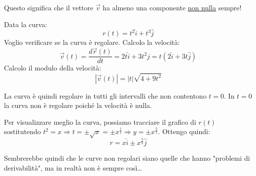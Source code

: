 Questo significa che il vettore $\vec v$ ha almeno una componente \underline{non nulla} sempre!

\begin{example}
    Data la curva:
    \begin{equation*}
        r(t)= t^2 \hat i + t^3 \hat j
    \end{equation*}
    Voglio verificare se la curva è regolare. Calcolo la velocità:
    \begin{equation*}
        \vec v(t) = \frac{d \vec r(t)}{dt} = 2t \hat i + 3t^2 \hat j=t(2\hat i + 3t \hat j)
    \end{equation*}
    Calcolo il modulo della velocità:
    \begin{equation*}
        |\vec v(t)| = |t| \sqrt{4 + 9t^2}
    \end{equation*}

    La curva è quindi regolare in tutti gli intervalli che non contentono $t=0$. In $t=0$ la curva non è regolare poiché la velocità è nulla.

    Per visualizzare meglio la curva, possiamo tracciare il grafico di $r(t)$ sostitutendo $t^2=x \Rightarrow t=\pm\sqrt{x}=\pm x^{\frac{1}{2}} \Rightarrow y=\pm x^{\frac{3}{2}}$. Ottengo quindi:
    \begin{equation*}
        r=x \hat i \pm x^{\frac{3}{2}} \hat j
    \end{equation*}

    \begin{figure}[H]
        \centering
    \end{figure}

\end{example}

Sembrerebbe quindi che le curve non regolari siano quelle che hanno "problemi di derivabilità", ma in realtà non è sempre così\dots

